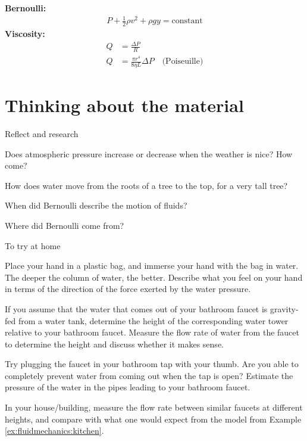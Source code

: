 {{\begin{importantEquations}
\begin{multicols}{2}
\textbf{Bernoulli:}
\begin{align*}
P+\frac{1}{2}\rho v^2+\rho gy=\textrm{constant}
\end{align*}
\textbf{Viscosity:}
\begin{align*}
Q&=\frac{\Delta P}{R}\\
Q&= \frac{\pi r^4}{8\eta L}\Delta P \quad \textrm{(Poiseuille)}
\end{align*}
\end{multicols}
\end{importantEquations}


\newpage
\section{Thinking about the material}

\begin{chapteractivity}{Reflect and research}
{
\item Does atmospheric pressure increase or decrease when the weather is nice? How come?
\item How does water move from the roots of a tree to the top, for a very tall tree?
\item When did Bernoulli describe the motion of fluids?
\item Where did Bernoulli come from?
}
\end{chapteractivity}
\begin{chapteractivity}{To try at home}
{
\item Place your hand in a plastic bag, and immerse your hand with the bag in water. The deeper the column of water, the better. Describe what you feel on your hand in terms of the direction of the force exerted by the water pressure.
\item If you assume that the water that comes out of your bathroom faucet is gravity-fed from a water tank, determine the height of the corresponding water tower relative to your bathroom faucet. Measure the flow rate of water from the faucet to determine the height and discuss whether it makes sense. 
\item Try plugging the faucet in your bathroom tap with your thumb. Are you able to completely prevent water from coming out when the tap is open? Estimate the pressure of the water in the pipes leading to your bathroom faucet.
\item In your house/building, measure the flow rate between similar faucets at different heights, and compare with what one would expect from the model from Example \ref{ex:fluidmechanics:kitchen}.
}
\end{chapteractivity}

}}
